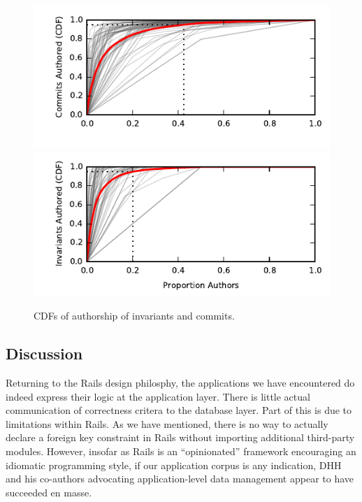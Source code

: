 \begin{figure}
  \newcommand{\skipht}{\\[-2em]}
\includegraphics[width=\columnwidth]{figs/commit-authorship-cdf.pdf}\vspace{-2em}
\includegraphics[width=\columnwidth]{figs/invariant-authorship-cdf.pdf}\vspace{-1em}
\caption{CDFs of authorship of invariants and commits.}
\label{fig:cdfs}
\end{figure}

\subsection{Discussion}

Returning to the Rails design philosphy, the applications we have
encountered do indeed express their logic at the application
layer. There is little actual communication of correctness critera to
the database layer. Part of this is due to limitations within
Rails. As we have mentioned, there is no way to actually declare a
foreign key constraint in Rails without importing additional
third-party modules. However, insofar as Rails is an ``opinionated''
framework encouraging an idiomatic programming style, if our
application corpus is any indication, DHH and his co-authors
advocating application-level data management appear to have succeeded en
masse.

